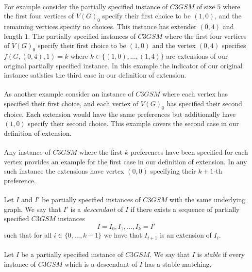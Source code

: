 \paragraph{}
For example consider the partially specified instance of $C3GSM$ of size $5$ where the first four vertices of $V(G)_0$ specify their first choice to be $(1,0)$, and the remaining vertices specify no choices. This instance has extender $(0,4)$ and length $1$. The partially specified instances of $C3GSM$ where the first four vertices of $V(G)_0$ specify their first choice to be $(1,0)$ and the vertex $(0,4)$ specifies $f(G,(0,4),1) = k$ where $k \in \{(1,0), \dots, (1,4)\}$ are extensions of our original partially specified instance. In this example the indicator of our original instance satisfies the third case in our definition of extension. 
\paragraph{}
As another example consider an instance of $C3GSM$ where each vertex has specified their first choice, and each vertex of $V(G)_0$ has specified their second choice. Each extension would have the same preferences but additionally have $(1,0)$ specify their second choice. This example covers the second case in our definition of extension. 
\paragraph{}
Any instance of $C3GSM$ where the first $k$ preferences have been specified for each vertex provides an example for the first case in our definition of extension. In any such instance the extensions have vertex $(0,0)$ specifying their $k+1$-th preference.

\paragraph{}Let $I$ and $I'$ be partially specified instances of $C3GSM$ with the same underlying graph. We say that $I'$ is a {\it descendant} of $I$ if there exists a sequence of partially specified $C3GSM$ instances
$$I = I_0, I_1, \dots, I_k=I'$$
such that for all $i \in \{0,\dots, k-1\}$ we have that $I_{i+1}$ is an extension of $I_i$.

\paragraph{}Let $I$ be a partially specified instance of $C3GSM$. We say that $I$ is {\it stable} if every instance of $C3GSM$ which is a descendant of $I$ has a stable matching.

